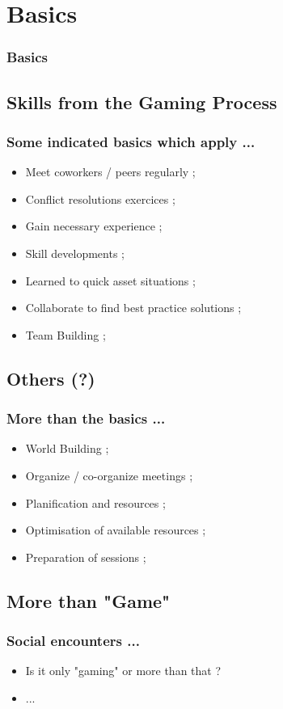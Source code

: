 \documentclass[slidetop,11pt]{beamer}
\begin{document}
\def\sectionIItitle{Basics}
\section{ \sectionIItitle }
\begin{frame}
	\frametitle{ \sectionIItitle }
	\tableofcontents[sections=2,currentsection,subsectionstyle=show/shaded/hide]
\end{frame} 

\subsection{ Skills from the Gaming Process}
\begin{frame}
	\frametitle{ Some indicated basics which apply ... }
	\begin{itemize}
		\item Meet coworkers / peers regularly ; 
		\item Conflict resolutions exercices ;  
		\item Gain necessary experience ; 
		\item Skill developments ; 
		\item Learned to quick asset situations ; 
		\item Collaborate to find best practice solutions ; 
		\item Team Building ; 
	\end{itemize}
\end{frame}

\subsection{ Others (?) }
\begin{frame}
	\frametitle{ More than the basics ... }
	\begin{itemize}
		\item World Building ; 
		\item Organize / co-organize meetings ; 
		\item Planification and resources ; 
		\item Optimisation of available resources ; 
		\item Preparation of sessions ; 
	\end{itemize}
\end{frame}

\subsection{ More than "Game" }
\begin{frame}
	\frametitle{ Social encounters ... }
	\begin{itemize}
		\item Is it only "gaming" or more than that ?
		\item ... 
	\end{itemize}
\end{frame}
\end{document}
